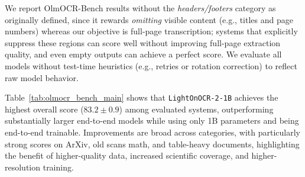 \documentclass{article}
\begin{document}


We report OlmOCR-Bench results without the \emph{headers/footers} category as originally defined, since it rewards \emph{omitting} visible content (e.g., titles and page numbers) whereas our objective is full-page transcription; systems that explicitly suppress these regions can score well without improving full-page extraction quality, and even empty outputs can achieve a perfect score. We evaluate all models without test-time heuristics (e.g., retries or rotation correction) to reflect raw model behavior.


Table~\ref{tab:olmocr_bench_main} shows that \texttt{LightOnOCR-2-1B} achieves the highest overall score ($83.2 \pm 0.9$) among evaluated systems, outperforming substantially larger end-to-end models while using only 1B parameters and being end-to-end trainable. Improvements are broad across categories, with particularly strong scores on ArXiv, old scans math, and table-heavy documents, highlighting the benefit of higher-quality data, increased scientific coverage, and higher-resolution training. 
\end{document}

